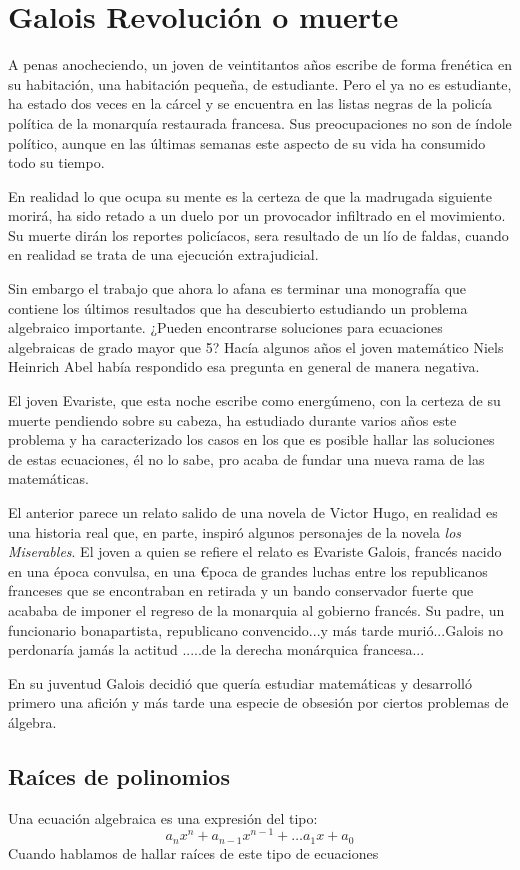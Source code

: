 \chapter{Galois Revolución o muerte}

A penas anocheciendo, un joven de veintitantos años escribe de forma frenética en su habitación, una habitación pequeña, de estudiante.  Pero el ya no es estudiante, ha estado dos veces en la cárcel y se encuentra en las listas negras de la policía política de la monarquía restaurada francesa. Sus preocupaciones no son de índole político, aunque en las últimas semanas este aspecto de su vida ha consumido todo su tiempo. 

En realidad lo que ocupa su mente es la  certeza de que la madrugada siguiente morirá, ha sido  retado a un duelo por un provocador infiltrado en el movimiento. Su muerte dirán los reportes policíacos, sera resultado de un lío de faldas, cuando en realidad se trata de una ejecución extrajudicial.

Sin embargo el trabajo que ahora lo afana es terminar una monografía que contiene los últimos resultados que ha descubierto estudiando un problema algebraico importante. ¿Pueden encontrarse soluciones para ecuaciones algebraicas de grado mayor que 5? Hacía algunos años el joven matemático Niels Heinrich Abel había respondido esa pregunta en general de manera negativa. 

 El joven Evariste, que esta noche escribe como energúmeno, con la certeza de su muerte pendiendo sobre su cabeza, ha estudiado durante varios años este problema y ha caracterizado los casos en los que es posible hallar las soluciones de estas ecuaciones, él no lo sabe, pro acaba de fundar una nueva rama de las matemáticas. 

El anterior parece un relato salido de una novela de Victor Hugo, en realidad es una historia real que, en parte, inspiró algunos personajes de la novela  {\it los Miserables}. El joven a quien se refiere el relato es Evariste Galois, francés nacido en una época convulsa, en una €poca de grandes luchas entre los republicanos franceses que se encontraban en retirada y un bando conservador fuerte que acababa de imponer el regreso de la monarquia al gobierno francés. Su padre, un funcionario bonapartista, republicano convencido...y  más tarde murió...Galois no perdonaría jamás la actitud .....de la derecha monárquica francesa...  

En su juventud Galois decidió que quería estudiar  matemáticas y desarrolló primero una afición y más tarde una especie de obsesión por ciertos problemas de álgebra. 

\section{Raíces de polinomios}

Una ecuación algebraica es una expresión del tipo:
$$
a_nx^n+a_{n-1}x^{n-1}+\dots a_1x+a_0
$$
 Cuando hablamos de hallar raíces de este tipo de ecuaciones

\section{}